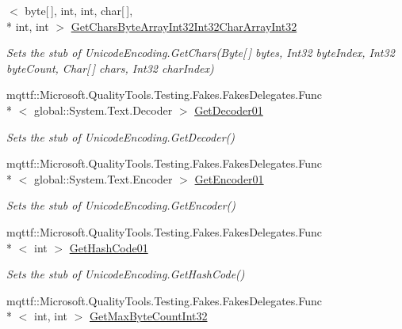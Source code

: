 \begin{DoxyCompactItemize}
$<$ byte\mbox{[}$\,$\mbox{]}, int, int, char\mbox{[}$\,$\mbox{]}, \\*
int, int $>$ \hyperlink{class_system_1_1_text_1_1_fakes_1_1_stub_unicode_encoding_ab0e0a16a23425043897d06723d7aa78a}{Get\-Chars\-Byte\-Array\-Int32\-Int32\-Char\-Array\-Int32}
\begin{DoxyCompactList}\small\item\em Sets the stub of Unicode\-Encoding.\-Get\-Chars(\-Byte\mbox{[}$\,$\mbox{]} bytes, Int32 byte\-Index, Int32 byte\-Count, Char\mbox{[}$\,$\mbox{]} chars, Int32 char\-Index)\end{DoxyCompactList}\item 
mqttf\-::\-Microsoft.\-Quality\-Tools.\-Testing.\-Fakes.\-Fakes\-Delegates.\-Func\\*
$<$ global\-::\-System.\-Text.\-Decoder $>$ \hyperlink{class_system_1_1_text_1_1_fakes_1_1_stub_unicode_encoding_a7045563686a56ccf40757e39a8e095ed}{Get\-Decoder01}
\begin{DoxyCompactList}\small\item\em Sets the stub of Unicode\-Encoding.\-Get\-Decoder()\end{DoxyCompactList}\item 
mqttf\-::\-Microsoft.\-Quality\-Tools.\-Testing.\-Fakes.\-Fakes\-Delegates.\-Func\\*
$<$ global\-::\-System.\-Text.\-Encoder $>$ \hyperlink{class_system_1_1_text_1_1_fakes_1_1_stub_unicode_encoding_af169393c529d8912e27ae879dc2cf72a}{Get\-Encoder01}
\begin{DoxyCompactList}\small\item\em Sets the stub of Unicode\-Encoding.\-Get\-Encoder()\end{DoxyCompactList}\item 
mqttf\-::\-Microsoft.\-Quality\-Tools.\-Testing.\-Fakes.\-Fakes\-Delegates.\-Func\\*
$<$ int $>$ \hyperlink{class_system_1_1_text_1_1_fakes_1_1_stub_unicode_encoding_a8bd78fadf33f11b449e3799d088d3d25}{Get\-Hash\-Code01}
\begin{DoxyCompactList}\small\item\em Sets the stub of Unicode\-Encoding.\-Get\-Hash\-Code()\end{DoxyCompactList}\item 
mqttf\-::\-Microsoft.\-Quality\-Tools.\-Testing.\-Fakes.\-Fakes\-Delegates.\-Func\\*
$<$ int, int $>$ \hyperlink{class_system_1_1_text_1_1_fakes_1_1_stub_unicode_encoding_ad8b0fe1ca02903a3e739de7a4c13e453}{Get\-Max\-Byte\-Count\-Int32}

\end{DoxyCompactItemize}
